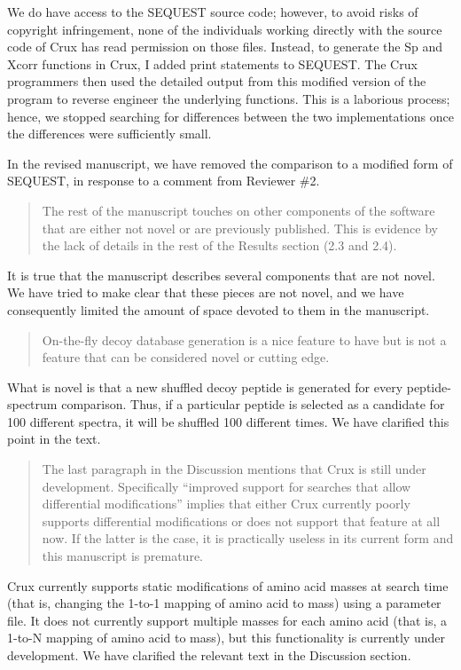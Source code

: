 \documentclass{article}
\newcommand{\breview}{\begin{quotation}\begin{em}\noindent}
\newcommand{\ereview}{\end{em}\end{quotation}}
\begin{document}
We do have access to the SEQUEST source code; however, to avoid risks
of copyright infringement, none of the individuals working directly
with the source code of Crux has read permission on those files.
Instead, to generate the Sp and Xcorr functions in Crux, I added print
statements to SEQUEST.  The Crux programmers then used the detailed
output from this modified version of the program to reverse engineer
the underlying functions.  This is a laborious process; hence, we
stopped searching for differences between the two implementations once
the differences were sufficiently small.

In the revised manuscript, we have removed the comparison to a
modified form of SEQUEST, in response to a comment from Reviewer \#2.

\breview The rest of the manuscript touches on other components of the
software that are either not novel or are previously published.  This
is evidence by the lack of details in the rest of the Results section
(2.3 and 2.4).  \ereview

It is true that the manuscript describes several components that are
not novel.  We have tried to make clear that these pieces are not
novel, and we have consequently limited the amount of space devoted to
them in the manuscript.

\breview On-the-fly decoy database generation is a nice feature to
have but is not a feature that can be considered novel or cutting
edge. \ereview

What is novel is that a new shuffled decoy peptide is generated for
every peptide-spectrum comparison.  Thus, if a particular peptide is
selected as a candidate for 100 different spectra, it will be shuffled
100 different times.  We have clarified this point in the text.

\breview The last paragraph in the Discussion mentions that Crux is
still under development.  Specifically ``improved support for searches
that allow differential modifications'' implies that either Crux
currently poorly supports differential modifications or does not
support that feature at all now.  If the latter is the case, it is
practically useless in its current form and this manuscript is
premature. \ereview

Crux currently supports static modifications of amino acid masses at
search time (that is, changing the 1-to-1 mapping of amino acid to
mass) using a parameter file. It does not currently support multiple
masses for each amino acid (that is, a 1-to-N mapping of amino acid to
mass), but this functionality is currently under development. We have
clarified the relevant text in the Discussion section.
\end{document}
